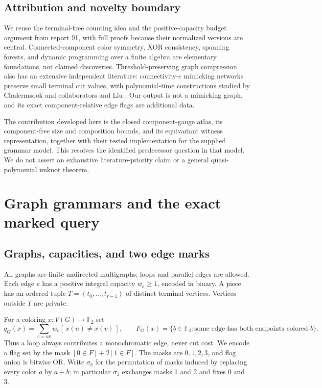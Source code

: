 \documentclass[11pt,letterpaper]{article}
\theoremstyle{definition}
\theoremstyle{remark}\newtheorem{remark}[theorem]{Remark}
\newcommand{\F}{\mathbb F}
\newcommand{\sw}{\sigma}
\begin{document}
\subsection{Attribution and novelty boundary}
We reuse the terminal-tree counting idea and the positive-capacity budget argument from report 91, with full proofs because their normalized versions are central. Connected-component color symmetry, XOR consistency, spanning forests, and dynamic programming over a finite algebra are elementary foundations, not claimed discoveries. Threshold-preserving graph compression also has an extensive independent literature: connectivity-$c$ mimicking networks preserve small terminal cut values, with polynomial-time constructions studied by Chalermsook and collaborators and Liu \cite{chalermsook,liu}. Our output is not a mimicking graph, and its exact component-relative edge flags are additional data.

The contribution developed here is the closed component-gauge atlas, its component-free size and composition bounds, and its equivariant witness representation, together with their tested implementation for the supplied grammar model. This resolves the identified predecessor question in that model. We do not assert an exhaustive literature-priority claim or a general quasi-polynomial unknot theorem.

\section{Graph grammars and the exact marked query}
\label{sec:model}
\subsection{Graphs, capacities, and two edge marks}
All graphs are finite undirected multigraphs; loops and parallel edges are allowed. Each edge $e$ has a positive integral capacity $w_e\ge1$, encoded in binary. A piece has an ordered tuple $T=(t_0,\ldots,t_{r-1})$ of distinct terminal vertices. Vertices outside $T$ are private.

For a coloring $x:V(G)\to\F_2$ set
\[
 q_G(x)=\sum_{e=uv}w_e[\,x(u)\ne x(v)\,],\qquad
 F_G(x)=\{b\in\F_2:\text{some edge has both endpoints colored }b\}.
\]
Thus a loop always contributes a monochromatic edge, never cut cost. We encode a flag set by the mask $[0\in F]+2[1\in F]$. The masks are $0,1,2,3$, and flag union is bitwise OR. Write $\sw_b$ for the permutation of masks induced by replacing every color $a$ by $a+b$; in particular $\sw_1$ exchanges masks 1 and 2 and fixes 0 and 3.
\end{document}
